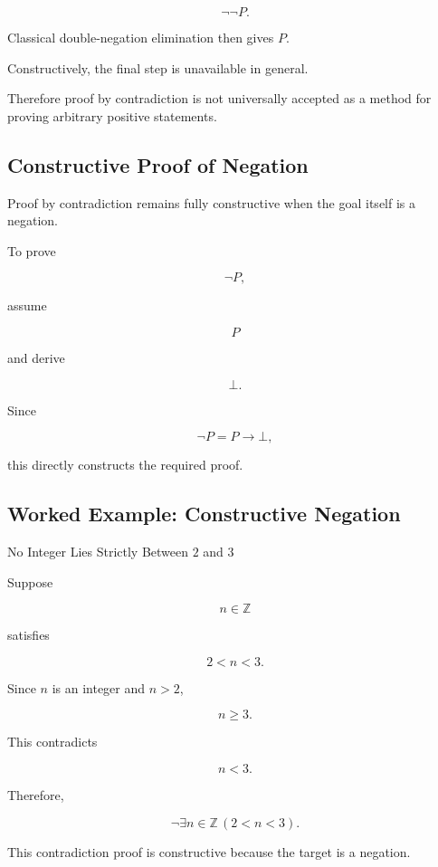 \[
\neg\neg P.
\]

Classical double-negation elimination then gives \(P\).

Constructively, the final step is unavailable in general.

Therefore proof by contradiction is not universally accepted as a method
for proving arbitrary positive statements.

\subsection{Constructive Proof of Negation}
\label{subsec:constructive-proof-negation}

Proof by contradiction remains fully constructive when the goal itself is a
negation.

To prove

\[
\boxed{
\neg P,
}
\]

assume

\[
P
\]

and derive

\[
\bot.
\]

Since

\[
\boxed{
\neg P
=
P\rightarrow\bot,
}
\]

this directly constructs the required proof.

\subsection{Worked Example: Constructive Negation}
\label{subsec:worked-constructive-negation}

\begin{workedexamplebox}{No Integer Lies Strictly Between \(2\) and \(3\)}

Suppose

\[
n\in\mathbb{Z}
\]

satisfies

\[
2<n<3.
\]

Since \(n\) is an integer and \(n>2\),

\[
n\geq3.
\]

This contradicts

\[
n<3.
\]

Therefore,

\begin{answerbox}
\[
\boxed{
\neg
\exists n\in\mathbb{Z}
\,
(2<n<3).
}
\]
\end{answerbox}

This contradiction proof is constructive because the target is a negation.

\end{workedexamplebox}

